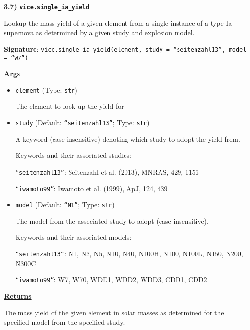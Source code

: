 \documentclass{report}
\begin{document}
\newpage 
\noindent
\begin{center}
\hypertarget{func:single_ia_yield}{
	\underline{\LARGE
		\textbf{3.7) \texttt{vice.single\_ia\_yield}}
	}
}
\end{center}
\par\noindent 
Lookup the mass yield of a given element from a single instance of a type Ia 
supernova as determined by a given study and explosion model. 
\par\null\par\noindent 
\textbf{Signature}: \texttt{vice.single\_ia\_yield(element, 
study = ``seitenzahl13'', model = ``W7'')}
\par\null\par\noindent
\underline{\textbf{Args}}
\begin{itemize}
	\item{
		\texttt{element} (Type: \texttt{str})
		\par
		The element to look up the yield for. 
	}

	\item{
		\texttt{study} (Default: \texttt{``seitenzahl13''}; Type: \texttt{str}) 
		\par
		A keyword (case-insensitive) denoting which study to adopt the yield 
		from. 
		\par
		Keywords and their associated studies: 
		\par\qquad 
		\texttt{``seitenzahl13''}: Seitenzahl et al. (2013), MNRAS, 429, 1156 
		\par\qquad 
		\texttt{``iwamoto99''}: Iwamoto et al. (1999), ApJ, 124, 439
	}

	\item{
		\texttt{model} (Default: \texttt{``N1''}; Type: \texttt{str}) 
		\par 
		The model from the associated study to adopt (case-insensitive). 
		\par
		Keywords and their associated models: 
		\par\qquad 
		\texttt{``seitenzahl13''}: N1, N3, N5, N10, N40, N100H, N100, N100L, 
		N150, N200, N300C 
		\par\qquad 
		\texttt{``iwamoto99''}: W7, W70, WDD1, WDD2, WDD3, CDD1, CDD2 
	}
\end{itemize}
\par\null\par\noindent 
\underline{\textbf{Returns}} 
\par\noindent 
The mass yield of the given element in solar masses as determined for the 
specified model from the specified study. 
\end{document}
